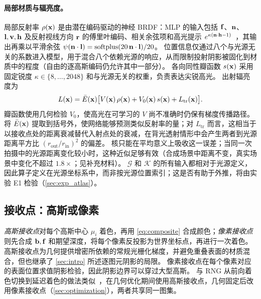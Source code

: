 \paragraph{局部材质与辐亮度。}
局部反射率 $\rho(\mathbf{x})$ 是由潜在编码驱动的神经 BRDF：MLP 的输入包括 $\mathbf{f}$、$\mathbf{n}$、$\mathbf{l},\mathbf{v},\mathbf{h}$ 及反射视线方向 $\mathbf{r}$ 的傅里叶编码、相关余弦项和高光提示 $e^{\kappa(\mathbf{n}\cdot\mathbf{h}-1)}$~\cite{zeng2023nrhints}，其输出再乘以平滑余弦 $\psi(\mathbf{n}\cdot\mathbf{l})=\operatorname{softplus}(20\,\mathbf{n}\cdot\mathbf{l})/20$。
位置信息仅通过八个与光源无关的系数进入模型，用于混合八个依赖光源的响应，从而限制投射阴影被固化到材质中的程度（自由的逐高斯编码仍允许其中一部分）。
各向同性瓣函数 $s(\mathbf{x})$ 采用固定锐度 $\kappa\in\{8,\dots,2048\}$ 和与光源无关的权重，负责表达尖锐高光。
出射辐亮度为
\begin{equation}
  L(\mathbf{x})=\bar E(\mathbf{x})\big[V(\mathbf{x})\,\rho(\mathbf{x})+V_0(\mathbf{x})\,s(\mathbf{x})+L_{\mathrm{tr}}(\mathbf{x})\big].
  \label{eq:radiance}
\end{equation}
瓣函数使用几何检验 $V_0$，使高光在可学习的 $V$ 尚不准确时仍保有梯度传播路径。
将 $\bar E(\mathbf{x})$ 提取到括号外，使网络能够预测类似反射率的量；对 $L_{\mathrm{tr}}$ 而言，这相当于以接收点处的距离衰减替代入射点处的衰减，在背光透射情形中会产生两者到光源距离平方比 $(r_{\mathrm{out}}/r_{\mathrm{in}})^2$ 的偏差。
核只能在平均意义上吸收这一误差；当同一次拍摄中的光源距离变化较小时，这种近似足够有效（合成场景中距离不变，真实场景中变化不超过 $1.8\times$；见补充材料）。
$\mathcal G$ 和 $\mathcal K$ 的所有输入都相对于光源定义，因此算子定义在光源坐标系中，而非按光源位置索引；这是否有助于外推，将由实验 E1 检验（\cref{sec:exp_atlas}）。

\subsection{接收点：高斯或像素}
\label{sec:receivers}
\emph{高斯接收点}对每个高斯中心 $\mu_i$ 着色，再用 \cref{eq:composite} 合成颜色；\emph{像素接收点}则先合成 $\mathbf{b},\mathbf{f}$ 和期望深度，将每个像素反投影为世界坐标点，再进行一次着色。
高斯接收点为几何提供增密所依赖的常规光栅化梯度，并避免重叠表面的材质混合，但也继承了 \cref{sec:intro} 所述逐图元阴影的局限。
像素接收点在每个像素对应的表面位置求值阴影检验，因此阴影边界可以穿过大型高斯。
与 RNG 从前向着色切换到延迟着色的做法类似~\cite{fan2025rng}，\ours 在几何优化期间使用高斯接收点，几何固定后改用像素接收点（\cref{sec:optimization}），两者共享同一图集。
